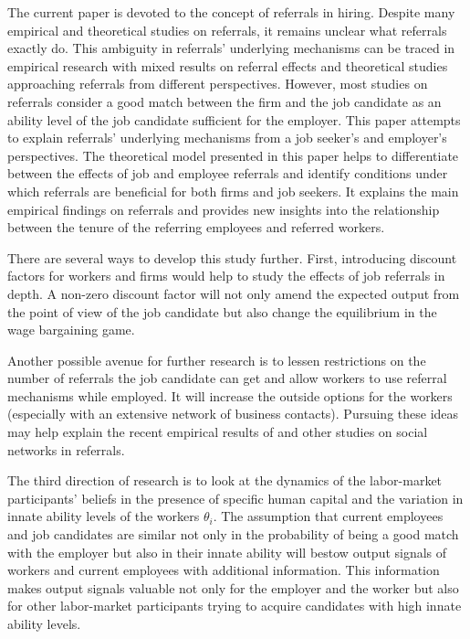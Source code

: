 \documentclass[12pt]{article}
\begin{document}
The current paper is devoted to the concept of referrals in hiring. Despite many empirical and theoretical studies on referrals, it remains unclear what referrals exactly do. This ambiguity in referrals' underlying mechanisms can be traced in empirical research with mixed results on referral effects and theoretical studies approaching referrals from different perspectives. However, most studies on referrals consider a good match between the firm and the job candidate as an ability level of the job candidate sufficient for the employer. This paper attempts to explain referrals' underlying mechanisms from a job seeker's and employer's perspectives. The theoretical model presented in this paper helps to differentiate between the effects of job and employee referrals and identify conditions under which referrals are beneficial for both firms and job seekers. It explains the main empirical findings on referrals and provides new insights into the relationship between the tenure of the referring employees and referred workers. 

There are several ways to develop this study further. First, introducing discount factors for workers and firms would help to study the effects of job referrals in depth. A non-zero discount factor will not only amend the expected output from the point of view of the job candidate but also change the equilibrium in the wage bargaining game.

Another possible avenue for further research is to lessen restrictions on the number of referrals the job candidate can get and allow workers to use referral mechanisms while employed. It will increase the outside options for the workers (especially with an extensive network of business contacts). Pursuing these ideas may help explain the recent empirical results of \cite{lester2021heterogeneous} and other studies on social networks in referrals.

The third direction of research is to look at the dynamics of the labor-market participants' beliefs in the presence of specific human capital and the variation in innate ability levels of the workers $\theta_i$. The assumption that current employees and job candidates are similar not only in the probability of being a good match with the employer but also in their innate ability will bestow output signals of workers and current employees with additional information. This information makes output signals valuable not only for the employer and the worker but also for other labor-market participants trying to acquire candidates with high innate ability levels.
\end{document}
